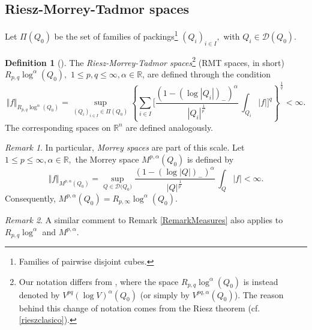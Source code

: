 \documentclass[11pt, a4paper,leqno]{amsart}
\theoremstyle{plain}
\numberwithin{equation}{section}
\theoremstyle{definition}
\newtheorem{definition}{Definition}
\theoremstyle{remark}
\newtheorem{remark}{Remark}
\def\R{\mathbb{R}}
\begin{document}
\subsection{Riesz-Morrey-Tadmor spaces}
 Let $\Pi(Q_{0})$ be the set of
families of packings\footnote{Families of pairwise disjoint cubes.}
$(Q_{i})_{i\in I},$ with $Q_{i}\in\mathcal{D}(Q_0)$. 


\begin{definition}[\cite{Tadmor}]\label{DefinitionRMT}
The   \emph{Riesz-Morrey-Tadmor spaces}\footnote{Our
notation differs from \cite{Tadmor}, where the space $R_{p,q}\log^{\alpha
}(Q_{0})$ is instead denoted by $V^{pq}(\log V)^{\alpha}(Q_{0})$ (or simply by
$V^{pq,\alpha}(Q_{0})$). The reason behind this change of notation comes from
the Riesz theorem (cf. \eqref{rieszclasico}).}%
(RMT spaces, in short) $R_{p,q}\log^{\alpha}(Q_{0}),$ $1\leq p,q\leq\infty
,\alpha\in\mathbb{R}$, are defined through the condition
\begin{equation}
\Vert f\Vert_{R_{p,q}\log^{\alpha}(Q_{0})}=\sup_{(Q_{i})_{i\in I}\in\Pi
(Q_{0})}\left\{\sum_{i\in I}\bigg[\frac{(1-(\log|Q_{i}|)_{-})^{\alpha}}%
{|Q_{i}|^{\frac{1}{p^{\prime}}}}\,\int_{Q_{i}}|f|\bigg]^{q}\right\}^{\frac
{1}{q}}<\infty.\label{aparece}%
\end{equation}
The corresponding spaces on $\R^n$ are defined analogously. 
\end{definition}

\begin{remark}\label{Remark3}
	In particular, \emph{Morrey spaces }are part of this
scale. Let $1\leq p\leq\infty,\alpha\in\mathbb{R},$ the Morrey space
$M^{p,\alpha}(Q_{0})$ is defined by
\begin{equation}
\Vert f\Vert_{M^{p,\alpha}(Q_0)}=\sup_{Q\in\mathcal{D(}Q_{0})}\frac{(1-(\log
|Q|)_{-})^{\alpha}}{|Q|^{\frac{1}{p^{\prime}}}}\,\int_{Q}|f|<\infty
.\label{aparecio}%
\end{equation}
Consequently, $M^{p,\alpha}(Q_{0})=R_{p,\infty}\log^{\alpha}(Q_{0}).$
\end{remark}

\begin{remark}
A similar comment to Remark \ref{RemarkMeasures} also applies to  $R_{p, q} \log^\alpha$ and $M^{p, \alpha}$.  
\end{remark}
\end{document}
